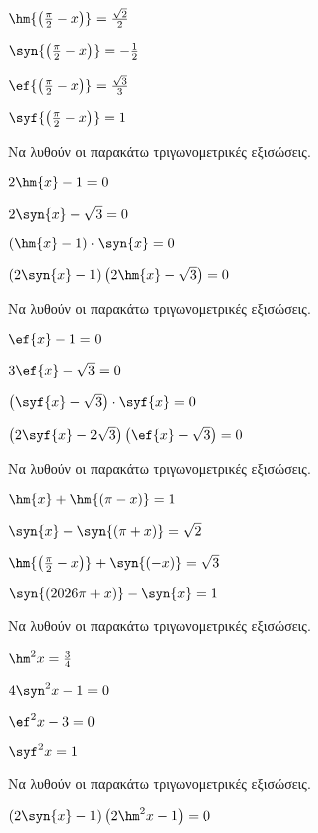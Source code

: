 \begin{multicols}{2}
\begin{multicols}{2}
\begin{rlist}[leftmargin=3mm]
\item $ \hm{\left( \frac{\pi}{2}-x\right) }=\frac{\sqrt{2}}{2} $
\item $ \syn{\left(\frac{\pi}{2}-x\right) }=-\frac{1}{2} $
\item $ \ef{\left(\frac{\pi}{2}-x\right) }=\frac{\sqrt{3}}{3} $
\item $ \syf{\left(\frac{\pi}{2}-x \right) }=1 $
\end{rlist}
\end{multicols}
\Askhsh 
Να λυθούν οι παρακάτω τριγωνομετρικές εξισώσεις.
\begin{rlist}
\item $ 2\hm{x}-1=0 $
\item $ 2\syn{x}-\sqrt{3}=0 $
\item $ (\hm{x}-1)\cdot\syn{x}=0 $
\item $ (2\syn{x}-1)\left( 2\hm{x}-\sqrt{3}\right) =0 $
\end{rlist}
\Askhsh 
Να λυθούν οι παρακάτω τριγωνομετρικές εξισώσεις.
\begin{rlist}
\item $ \ef{x}-1=0 $
\item $ 3\ef{x}-\sqrt{3}=0 $
\item $ \left( \syf{x}-\sqrt{3}\right) \cdot\syf{x}=0 $
\item $ \left( 2\syf{x}-2\sqrt{3}\right) \left( \ef{x}-\sqrt{3}\right) =0 $
\end{rlist}
\Askhsh 
Να λυθούν οι παρακάτω τριγωνομετρικές εξισώσεις.
\begin{rlist}
\item $ \hm{x}+\hm{(\pi-x)}=1 $
\item $ \syn{x}-\syn{(\pi+x)}=\sqrt{2} $
\item $ \hm{\left( \frac{\pi}{2}-x\right) }+\syn{(-x)}=\sqrt{3} $
\item $ \syn{\left(\the\year\pi+x \right) }-\syn{x}=1 $
\end{rlist}
\Askhsh 
Να λυθούν οι παρακάτω τριγωνομετρικές εξισώσεις.
\begin{rlist}
\item $ \hm^2{x}=\frac{3}{4} $
\item $ 4\syn^2{x}-1=0 $
\item $ \ef^2{x}-3=0 $
\item $ \syf^2{x}=1 $
\end{rlist}
\Askhsh Να λυθούν οι παρακάτω τριγωνομετρικές εξισώσεις.
\begin{rlist}
\item $ \left(2\syn{x}-1\right)\left( 2\hm^2{x}-1\right)=0 $

\end{rlist}
\end{multicols}
